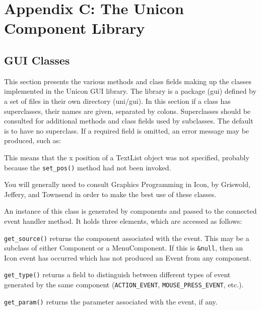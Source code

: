 \clearpage\section{Appendix C: The Unicon Component Library}

\subsection{GUI Classes}

This section presents the various methods and class fields making up the
classes implemented in the Unicon GUI library. The library is a package
(gui) defined by a set of files in their own directory (uni/gui). In
this section if a class has superclasses, their names are given,
separated by colons. Superclasses should be consulted for additional
methods and class fields used by subclasses. The
default is to have no superclass.
If a required field is omitted, an error message may be produced,
such as:


\noindent This means that the x position of a TextList object was not specified,
probably because the \texttt{set\_pos()} method had not been invoked.

You will generally need to consult
{\textquotedbl}Graphics Programming in Icon{\textquotedbl}, by
Griswold, Jeffery, and Townsend
in order to make the best use of these classes.


An instance of this class is generated by components and passed to the
connected event handler method. It holds three elements, which
are accessed as follows:

\noindent\texttt{get\_source()} returns the component associated with the event. This may
be a subclass of either Component or a MenuComponent. If this is
\texttt{\&null}, then an Icon event has occurred which has not produced an Event
from any component.

\noindent\texttt{get\_type()} returns a field to distinguish between different types of
event generated by the same component (\texttt{ACTION\_EVENT},
\texttt{MOUSE\_PRESS\_EVENT}, etc.).

\noindent\texttt{get\_param()} returns the parameter associated with the event, if any.


